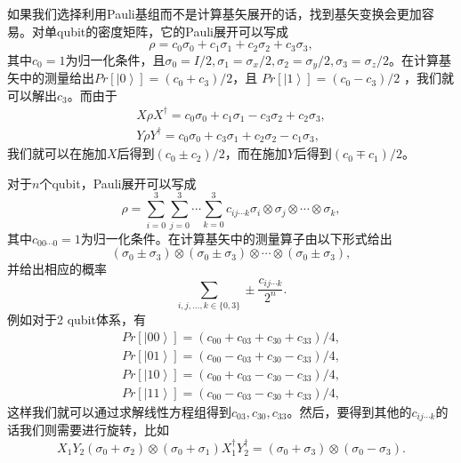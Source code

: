 如果我们选择利用Pauli基组而不是计算基矢展开的话，找到基矢变换会更加容易。对单qubit的密度矩阵，它的Pauli展开可以写成
\begin{equation}\label{aaa}
\rho = c_0 \sigma_0+c_1 \sigma_1+c_2 \sigma_2+c_3 \sigma_3,
\end{equation}
其中$c_0=1$为归一化条件，且$\sigma_0 = I/2, \sigma_1 = \sigma_x/2,\sigma_2 = \sigma_y/2,\sigma_3 = \sigma_z/2$。在计算基矢中的测量给出$Pr[\left \vert 0 \right \rangle] = (c_0+c_3)/2$，且 $Pr[\left \vert 1 \right \rangle] = (c_0-c_3)/2$ ，我们就可以解出$c_3$。而由于
\begin{eqnarray}\label{aaa}
X\rho X^{\dagger} = c_0 \sigma_0+c_1 \sigma_1-c_3 \sigma_2+c_2 \sigma_3, \nonumber \\
Y\rho Y^{\dagger} = c_0 \sigma_0+c_3 \sigma_1+c_2 \sigma_2-c_1 \sigma_3,
\end{eqnarray}
我们就可以在施加$X$后得到$(c_0\pm c_2)/2$，而在施加$Y$后得到$(c_0\mp c_1)/2$。

对于$n$个qubit，Pauli展开可以写成
\begin{equation}\label{aaa}
\rho = \sum_{i =0}^3  \sum_{j =0}^3 \cdots \sum_{k =0}^3 c_{ij\cdots k} \sigma_i\otimes \sigma_j \otimes\cdots \otimes \sigma_k,
\end{equation}
其中$c_{00\cdots 0}=1$为归一化条件。在计算基矢中的测量算子由以下形式给出
\begin{equation}\label{aaa}
(\sigma_0 \pm \sigma_3) \otimes (\sigma_0 \pm \sigma_3)\otimes\cdots \otimes (\sigma_0 \pm \sigma_3),
\end{equation}
并给出相应的概率
\begin{equation}\label{aaa}
\sum_{i,j,\ldots,k\in \{0,3\}} \pm \frac{c_{ij\cdots k}}{2^n}.
\end{equation}
例如对于2 qubit体系，有
\begin{eqnarray}\label{aaa}
Pr[\left \vert 00 \right \rangle] = (c_{00}+c_{03}+c_{30}+c_{33})/4, \\
Pr[\left \vert 01 \right \rangle] = (c_{00}-c_{03}+c_{30}-c_{33})/4,\\
Pr[\left \vert 10 \right \rangle] = (c_{00}+c_{03}-c_{30}-c_{33})/4,\\
Pr[\left \vert 11 \right \rangle] = (c_{00}-c_{03}-c_{30}+c_{33})/4,
\end{eqnarray}
这样我们就可以通过求解线性方程组得到$c_{03},c_{30},c_{33}$。然后，要得到其他的$c_{ij\cdots k}$的话我们则需要进行旋转，比如
\begin{equation}\label{aaa}
X_1Y_2(\sigma_0 + \sigma_2)\otimes(\sigma_0 + \sigma_1)X_1^{\dagger}Y_2^{\dagger} = (\sigma_0 + \sigma_3)\otimes(\sigma_0 - \sigma_3).
\end{equation}

